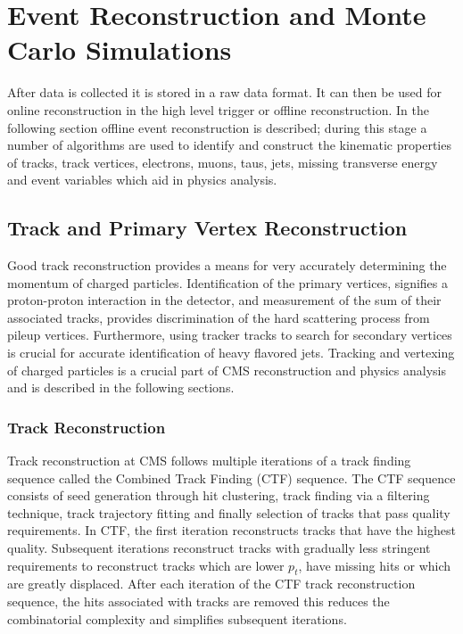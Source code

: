 \chapter{Event Reconstruction and Monte Carlo Simulations}
After data is collected it is stored in a raw data format.
It can then be used for online reconstruction in the high level trigger
or offline reconstruction. 
In the following section offline event reconstruction is described;
during this stage a number of algorithms are used to identify and
construct the kinematic properties 
of tracks, track vertices,  electrons, muons, taus, jets, missing transverse energy and 
event variables which aid in physics analysis.  
\section{Track and Primary Vertex Reconstruction}
Good track reconstruction provides a means for very accurately determining
the momentum of charged particles.
Identification of the primary vertices, signifies a proton-proton interaction in the detector, and 
measurement of the sum of their associated tracks, 
provides discrimination of the hard scattering process 
from pileup vertices.
Furthermore, using tracker tracks to search for secondary vertices
is crucial for accurate identification of heavy flavored jets.
Tracking and vertexing of charged particles is a crucial part of CMS reconstruction
and physics analysis and is described in the following sections.
\subsection{Track Reconstruction}
\label{sec:TrackReco}
Track reconstruction at CMS follows multiple iterations of a track finding sequence
called the Combined Track Finding (CTF) sequence. 
The CTF sequence consists of seed generation through hit clustering,
track finding via a filtering technique, track trajectory fitting and finally
selection of tracks that pass quality requirements. 
In CTF, the first iteration reconstructs tracks that
have the highest quality. Subsequent iterations reconstruct
tracks with gradually less stringent requirements 
to reconstruct tracks which are lower $p_{t}$, have missing hits or which are greatly displaced.
After each iteration of the CTF track reconstruction sequence, the hits
associated with tracks are removed this reduces the combinatorial complexity
and simplifies subsequent iterations.%


